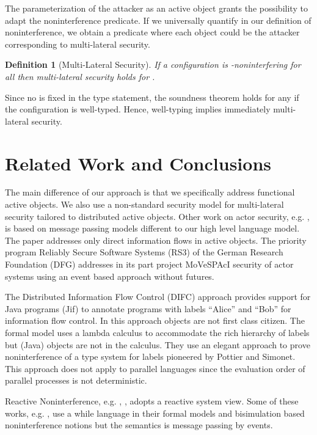 \documentclass[10pt, conference, compsocconf]{IEEEtran}
\newtheorem{definition}{Definition}[section]
\begin{document}
{The parameterization of the attacker as an active object  grants the 
possibility to adapt the noninterference predicate.
If we universally quantify  in our definition of noninterference, we 
obtain a predicate where each object could be the attacker corresponding to multi-lateral security.
\begin{definition}[Multi-Lateral Security]
If a configuration  is -noninterfering for all
 then multi-lateral security holds for .
\end{definition}
Since no  is fixed in the type statement, the soundness theorem holds
for any  if the configuration is well-typed. Hence, well-typing implies
immediately multi-lateral security.




\section{Related Work and Conclusions}
\label{sec:concl}
The main difference of our approach is that we specifically address functional active 
objects. We also use a non-standard security model \cite{kam:12} for 
multi-lateral security tailored to distributed active objects.
Other work on actor security, e.g. \cite{hmss:07}, is based on message passing
models different to our high level language model. The paper \cite{achl:07}
addresses only direct information flows in active objects.
The priority program Reliably Secure Software Systems (RS3) of the 
German Research Foundation (DFG) \cite{rs3:10} addresses in its part project MoVeSPAcI 
\cite{pf:11} security of actor systems using an event based approach without futures.

The Distributed Information Flow Control (DIFC) approach \cite{ml:97} provides
support for Java programs (Jif) to annotate programs with labels ``Alice'' 
and ``Bob'' for information flow control. In this approach objects are not first class
citizen. The formal model \cite{zm:07} uses a lambda calculus  to 
accommodate the rich hierarchy of labels but (Java) objects are not in the calculus.
They use an elegant approach to prove noninterference of a type system for labels
pioneered by \cite{ps:03} Pottier and Simonet. This approach does not apply to parallel 
languages since the evaluation order of parallel processes is not deterministic.

Reactive Noninterference, e.g. \cite{DBLP:journals/jlp/MatosBC07}, \cite{bpswz:09},
adopts a reactive system view. Some of these works, 
e.g. \cite{occ:06}, use a while language in their formal models and bisimulation
based noninterference notions but the semantics is message passing by events.

}
\end{document}
